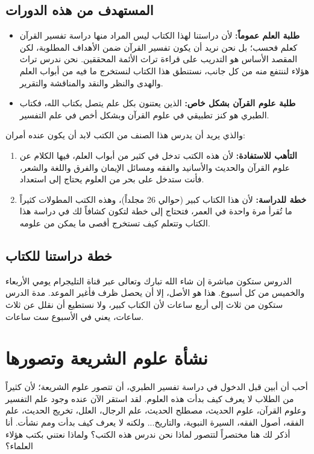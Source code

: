 \subsection*{المستهدف من هذه الدورات}
\begin{itemize}
    \item \textbf{طلبة العلم عموماً:} لأن دراستنا لهذا الكتاب ليس المراد منها دراسة تفسير القرآن كعلم فحسب؛ بل نحن نريد أن يكون تفسير القرآن ضمن الأهداف المطلوبة، لكن المقصد الأساس هو التدريب على قراءة تراث الأئمة المحققين. نحن ندرس تراث هؤلاء لننتفع منه من كل جانب، نستنطق هذا الكتاب لنستخرج ما فيه من أبواب العلم والهدى والنظر والنقد والمناقشة والتقرير.
    \item \textbf{طلبة علوم القرآن بشكل خاص:} الذين يعتنون بكل علم يتصل بكتاب الله، فكتاب الطبري هو كنز تطبيقي في علوم القرآن وبشكل أخص في علم التفسير.
\end{itemize}

والذي يريد أن يدرس هذا الصنف من الكتب لابد أن يكون عنده أمران:
\begin{enumerate}
    \item \textbf{التأهب للاستفادة:} لأن هذه الكتب تدخل في كثير من أبواب العلم، فيها الكلام عن علوم القرآن والحديث والأسانيد والفقه ومسائل الإيمان والفرق واللغة والشعر، فأنت ستدخل على بحر من العلوم يحتاج إلى استعداد.
    \item \textbf{خطة للدراسة:} لأن هذا الكتاب كبير (حوالي 26 مجلداً)، وهذه الكتب المطولات كثيراً ما تُقرأ مرة واحدة في العمر، فتحتاج إلى خطة لتكون كشافاً لك في دراسة هذا الكتاب وتتعلم كيف تستخرج أقصى ما يمكن من علومه.
\end{enumerate}

\subsection*{خطة دراستنا للكتاب}
الدروس ستكون مباشرة إن شاء الله تبارك وتعالى عبر قناة التليجرام يومي الأربعاء والخميس من كل أسبوع. هذا هو الأصل، إلا أن يحصل ظرف فأغير الموعد. مدة الدرس ستكون من ثلاث إلى أربع ساعات لأن الكتاب كبير، ولا نستطيع أن نقلل عن ثلاث ساعات، يعني في الأسبوع ست ساعات.

\section*{نشأة علوم الشريعة وتصورها}
أحب أن أبين قبل الدخول في دراسة تفسير الطبري، أن تتصور علوم الشريعة؛ لأن كثيراً من الطلاب لا يعرف كيف بدأت هذه العلوم. لقد استقر الآن عنده وجود علم التفسير وعلوم القرآن، علوم الحديث، مصطلح الحديث، علم الرجال، العلل، تخريج الحديث، علم الفقه، أصول الفقه، السيرة النبوية، والتاريخ... ولكنه لا يعرف كيف بدأت ومم نشأت. أنا أذكر لك هنا مختصراً لتتصور لماذا نحن ندرس هذه الكتب؟ ولماذا نعتني بكتب هؤلاء العلماء؟

